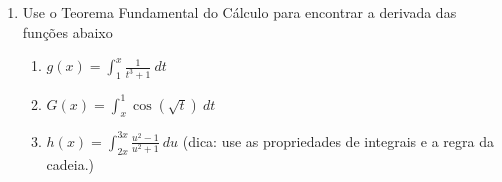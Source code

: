 \documentclass[a4paper,5pt]{amsbook}
\begin{document}
\begin{enumerate}
    \vspace{0.5cm}
    \item Use o Teorema Fundamental do C\'alculo para encontrar a derivada das
    	fun\c{c}\~oes abaixo
    \begin{enumerate}
    	\item $\displaystyle g(x) = \int_1^x \frac{1}{t^3 + 1}\ dt$
    	\item $\displaystyle G(x) = \int_x^1 \cos(\sqrt{t})\ dt$
        \item $\displaystyle h(x) = \int_{2x}^{3x} \frac{u^2 - 1}{u^2 + 1}\ du$
            (dica: use as propriedades de integrais e a regra da cadeia.)
    \end{enumerate}
\end{enumerate}
\end{document}
